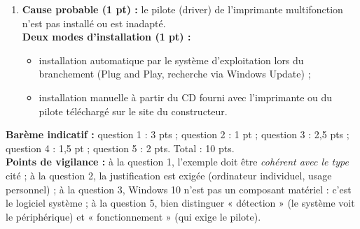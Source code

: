 \documentclass[11pt]{article}
\begin{document}
\begin{corrige}
\begin{enumerate}
\begin{itemize}
\item protéger les postes : Avast, Kaspersky ou Windows Defender — logiciel d'application (antivirus) ;
\item graver des CD : Nero Burning ROM ou CDBurnerXP — logiciel d'application (logiciel de gravure).
\end{itemize}
\item \textbf{Cause probable (1 pt) :} le pilote (driver) de l'imprimante multifonction n'est pas installé ou est inadapté.\\
\textbf{Deux modes d'installation (1 pt) :}
\begin{itemize}
\item installation automatique par le système d'exploitation lors du branchement (Plug and Play, recherche via Windows Update) ;
\item installation manuelle à partir du CD fourni avec l'imprimante ou du pilote téléchargé sur le site du constructeur.
\end{itemize}
\end{enumerate}
\textbf{Barème indicatif :} question 1 : 3 pts ; question 2 : 1 pt ; question 3 : 2,5 pts ; question 4 : 1,5 pt ; question 5 : 2 pts. Total : 10 pts.\\
\textbf{Points de vigilance :} à la question 1, l'exemple doit être \emph{cohérent avec le type} cité ; à la question 2, la justification est exigée (ordinateur individuel, usage personnel) ; à la question 3, Windows 10 n'est pas un composant matériel : c'est le logiciel système ; à la question 5, bien distinguer « détection » (le système voit le périphérique) et « fonctionnement » (qui exige le pilote).
\end{corrige}
\end{document}
